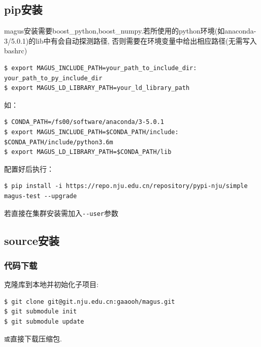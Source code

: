 \documentclass[12pt]{article}
\begin{document}
\subsection{pip安装}
magus安装需要boost\_python,boost\_numpy.若所使用的python环境(如anaconda-3/5.0.1)的lib中有会自动探测路径,
否则需要在环境变量中给出相应路径(无需写入bashrc)
\begin{tcolorbox}
    \begin{verbatim}
$ export MAGUS_INCLUDE_PATH=your_path_to_include_dir: your_path_to_py_include_dir
$ export MAGUS_LD_LIBRARY_PATH=your_ld_library_path
    \end{verbatim}
\end{tcolorbox}
如：
\begin{tcolorbox}
    \begin{verbatim}
$ CONDA_PATH=/fs00/software/anaconda/3-5.0.1
$ export MAGUS_INCLUDE_PATH=$CONDA_PATH/include: $CONDA_PATH/include/python3.6m
$ export MAGUS_LD_LIBRARY_PATH=$CONDA_PATH/lib
    \end{verbatim}
\end{tcolorbox}
配置好后执行：
\begin{tcolorbox}
    \begin{verbatim}
$ pip install -i https://repo.nju.edu.cn/repository/pypi-nju/simple magus-test --upgrade
    \end{verbatim}
\end{tcolorbox}

  若直接在集群安装需加入\verb|--user|参数
\subsection{source安装}
\subsubsection{代码下载}
克隆库到本地并初始化子项目:
\begin{tcolorbox}
    \begin{verbatim}
$ git clone git@git.nju.edu.cn:gaaooh/magus.git
$ git submodule init
$ git submodule update
    \end{verbatim}
\end{tcolorbox}
\texttt 
或直接下载压缩包.
\end{document}
